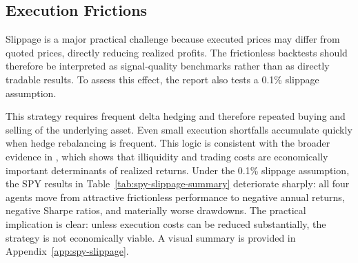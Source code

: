 ﻿\documentclass{article}
\begin{document}
\subsection{Execution Frictions}
Slippage is a major practical challenge because executed prices may differ from quoted prices, directly reducing realized profits. The frictionless backtests should therefore be interpreted as signal-quality benchmarks rather than as directly tradable results. To assess this effect, the report also tests a 0.1\% slippage assumption.

\begin{table}[H]
\centering
\footnotesize
\caption{SPY performance summary after incorporating slippage.}
\label{tab:spy-slippage-summary}
\end{table}

This strategy requires frequent delta hedging and therefore repeated buying and selling of the underlying asset. Even small execution shortfalls accumulate quickly when hedge rebalancing is frequent. This logic is consistent with the broader evidence in \cite{amihud2002}, which shows that illiquidity and trading costs are economically important determinants of realized returns. Under the 0.1\% slippage assumption, the SPY results in Table~\ref{tab:spy-slippage-summary} deteriorate sharply: all four agents move from attractive frictionless performance to negative annual returns, negative Sharpe ratios, and materially worse drawdowns. The practical implication is clear: unless execution costs can be reduced substantially, the strategy is not economically viable. A visual summary is provided in Appendix~\ref{app:spy-slippage}.
\end{document}
